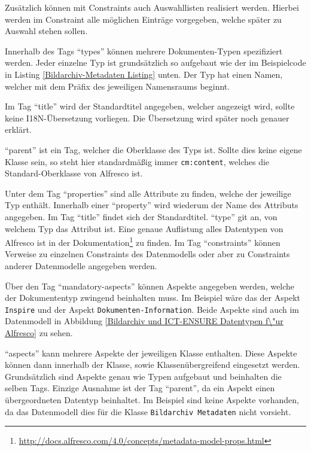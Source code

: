 Zus\"atzlich k\"onnen mit Constraints auch Auswahllisten realisiert werden. Hierbei werden im Constraint alle m\"oglichen Eintr\"age vorgegeben, welche sp\"ater zu Auswahl stehen sollen.

Innerhalb des Tags "`types"' k\"onnen mehrere Dokumenten-Typen spezifiziert werden. Jeder einzelne Typ ist grunds\"atzlich so aufgebaut wie der im Beispielcode in Listing \ref{Bildarchiv-Metadaten Listing} unten. Der Typ hat einen Namen, welcher mit dem Pr\"afix des jeweiligen Namensraums beginnt. 

Im Tag "`title"' wird der Standardtitel angegeben, welcher angezeigt wird, sollte keine I18N-\"Ubersetzung vorliegen. Die \"Ubersetzung wird sp\"ater noch genauer erkl\"art.

"`parent"' ist ein Tag, welcher die Oberklasse des Typs ist. Sollte dies keine eigene Klasse sein, so steht hier standardm\"a\ss{}ig immer \texttt{cm:content}, welches die Standard-Oberklasse von Alfresco ist.

Unter dem Tag "`properties"' sind alle Attribute zu finden, welche der jeweilige Typ enth\"alt. Innerhalb einer "`property"' wird wiederum der Name des Attributs angegeben. Im Tag "`title"' findet sich der Standardtitel. "`type"' git an, von welchem Typ das Attribut ist. Eine genaue Auflistung alles Datentypen von Alfresco ist in der Dokumentation\footnote{\url{http://docs.alfresco.com/4.0/concepts/metadata-model-props.html}} zu finden. Im Tag "`constraints"' k\"onnen Verweise zu einzelnen Constraints des Datenmodells oder aber zu Constraints anderer Datenmodelle angegeben werden. 

\"Uber den Tag "`mandatory-aspects"' k\"onnen Aspekte angegeben werden, welche der Dokumententyp zwingend beinhalten muss. Im Beispiel w\"are das der Aspekt \texttt{Inspire} und der Aspekt \texttt{Dokumenten-Information}. Beide Aspekte sind auch im Datenmodell in Abbildung \ref{Bildarchiv und ICT-ENSURE Datentypen f\"ur Alfresco} zu sehen.

"`aspects"' kann mehrere Aspekte der jeweiligen Klasse enthalten. Diese Aspekte k\"onnen dann innerhalb der Klasse, sowie Klassen\"ubergreifend eingesetzt werden. Grunds\"atzlich sind Aspekte genau wie Typen aufgebaut und beinhalten die selben Tags. Einzige Ausnahme ist der Tag "`parent"', da ein Aspekt einen \"ubergeordneten Datentyp beinhaltet. Im Beispiel sind keine Aspekte vorhanden, da das Datenmodell dies f\"ur die Klasse \texttt{Bildarchiv Metadaten} nicht vorsieht. 



